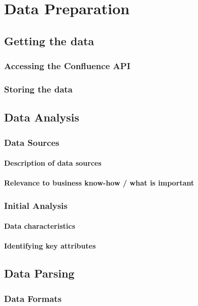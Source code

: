 \chapter{Data Preparation}

\section{Getting the data}
\subsection{Accessing the Confluence API}
\subsection{Storing the data}

\section{Data Analysis}

\subsection{Data Sources}
\subsubsection{Description of data sources}
\subsubsection{Relevance to business know-how / what is important}

\subsection{Initial Analysis}
\subsubsection{Data characteristics}
\subsubsection{Identifying key attributes}

\section{Data Parsing}

\subsection{Data Formats}
